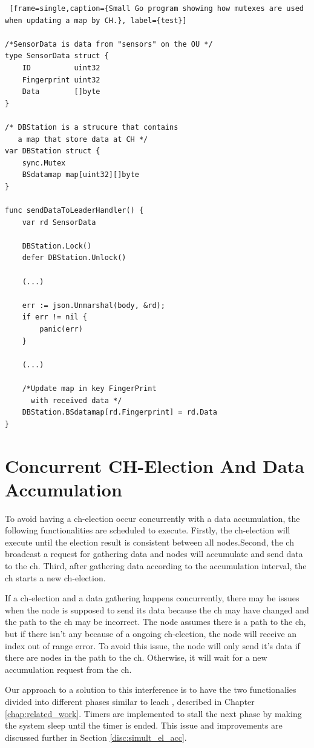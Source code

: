 \documentclass[USenglish]{uit-thesis}
\begin{document}
\begin{lstlisting} [frame=single,caption={Small Go program showing how mutexes are used when updating a map by CH.}, label={test}]

/*SensorData is data from "sensors" on the OU */
type SensorData struct {
	ID          uint32
	Fingerprint uint32
	Data        []byte
}

/* DBStation is a strucure that contains 
   a map that store data at CH */
var DBStation struct {
	sync.Mutex
	BSdatamap map[uint32][]byte
}

func sendDataToLeaderHandler() {
	var rd SensorData
	
	DBStation.Lock()
	defer DBStation.Unlock()
	
	(...)
	
	err := json.Unmarshal(body, &rd); 
	if err != nil {
		panic(err)
	}
	
	(...)
	
	/*Update map in key FingerPrint
	  with received data */
	DBStation.BSdatamap[rd.Fingerprint] = rd.Data
}
\end{lstlisting}


\newpage

\section{Concurrent CH-Election And Data Accumulation} \label{sec:conc_events}
To avoid having a \gls{ch}-election occur concurrently with a data accumulation, the following functionalities are scheduled to execute.
Firstly, the \gls{ch}-election will execute until the election result is consistent between all nodes.Second, the \gls{ch} broadcast a request for gathering data and nodes will accumulate and send data to the \gls{ch}. Third, after gathering data according to the accumulation interval, the \gls{ch} starts a new \gls{ch}-election. 

If a \gls{ch}-election and a data gathering happens concurrently, there may be issues when the node is supposed to send its data because the \gls{ch} may have changed and the path to the \gls{ch} may be incorrect. The node assumes there is a path to the \gls{ch}, but if there isn't any because of a ongoing \gls{ch}-election, the node will receive an index out of range error. To avoid this issue, the node will only send it's data if there are nodes in the path to the \gls{ch}. Otherwise, it will wait for a new accumulation request from the \gls{ch}.

Our approach to a solution to this interference is to have the two functionalies divided into different phases similar to \gls{leach} \cite{leach}, described in Chapter \ref{chap:related_work}. Timers are implemented to stall the next phase by making the system sleep until the timer is ended. This issue and improvements are discussed further in Section \ref{disc:simult_el_acc}.
\end{document}

